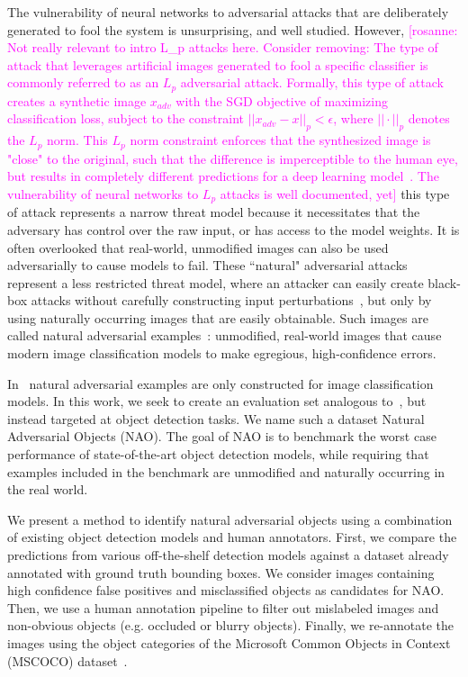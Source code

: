 \documentclass[final]{cvpr}
\newcommand{\comments}[1]{#1}
\newcommand{\comments}[1]{}
\newcommand{\rosanne}[1]{\comments{\textcolor{magenta}{[rosanne: #1]}}}
\begin{document}
 The vulnerability of neural networks to adversarial attacks that are deliberately generated to fool the system is unsurprising, and well studied. However,
 \rosanne{Not really relevant to intro L_p attacks here. Consider removing: 
 The type of attack that leverages artificial images generated to fool a specific classifier is commonly referred to as an $L_p$ adversarial attack.
Formally, this type of attack creates a synthetic image $x_{adv}$ with the SGD objective of maximizing classification loss, subject to the constraint $||x_{adv} - x ||_p < \epsilon $, where $ || \cdot ||_p$ denotes the $L_p$ norm. This $L_p$ norm constraint enforces that the synthesized image is "close" to the original, such that the difference is imperceptible to the human eye, but results in completely different predictions for a deep learning model~\cite{gilmer2018motivating}.
The vulnerability of neural networks to $L_p$ attacks is well documented, yet}
this type of attack represents a narrow threat model because it necessitates that the adversary has control over the raw input, or has access to the model weights. It is often overlooked that real-world, unmodified images can also be used adversarially to cause models to fail. These ``natural" adversarial attacks represent a less restricted threat model, where an attacker can easily create black-box attacks without carefully constructing input perturbations~\cite{gilmer2018motivating}, but only by using  naturally occurring images that are easily obtainable. Such images are called natural adversarial examples~\cite{Hendrycks2019-cn}: unmodified, real-world images that cause modern image classification models to make egregious, high-confidence errors.

In~\cite{Hendrycks2019-cn} natural adversarial examples are only constructed for image classification models. In this work, we seek to create an evaluation set analogous to~\cite{Hendrycks2019-cn}, but instead targeted at object detection tasks. We name such a dataset Natural Adversarial Objects (NAO). The goal of NAO is to benchmark the worst case performance of state-of-the-art object detection models, while requiring that examples included in the benchmark are unmodified and naturally occurring in the real world. 

We present a method to identify natural adversarial objects using a combination of existing object detection models and human annotators.
First, we compare the predictions from various off-the-shelf detection models against a dataset already annotated with ground truth bounding boxes. We consider images containing high confidence false positives and misclassified objects as candidates for NAO.
Then, we use a human annotation pipeline to filter out mislabeled images and non-obvious objects (e.g. occluded or blurry objects). Finally, we re-annotate the images using the object categories of the Microsoft Common Objects in Context (MSCOCO) dataset~\cite{lin2014microsoft}.
\end{document}
